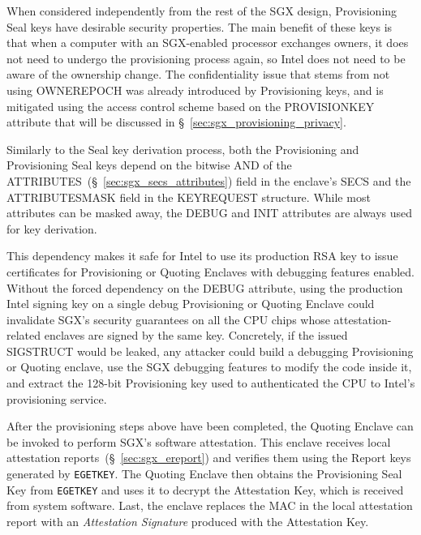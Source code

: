 When considered independently from the rest of the SGX design, Provisioning
Seal keys have desirable security properties. The main benefit of these keys is
that when a computer with an SGX-enabled processor exchanges owners, it does
not need to undergo the provisioning process again, so Intel does not need to
be aware of the ownership change. The confidentiality issue that stems from not
using OWNEREPOCH was already introduced by Provisioning keys, and is mitigated
using the access control scheme based on the PROVISIONKEY attribute that will
be discussed in \S~\ref{sec:sgx_provisioning_privacy}.

Similarly to the Seal key derivation process, both the Provisioning and
Provisioning Seal keys depend on the bitwise AND of the
ATTRIBUTES~(\S~\ref{sec:sgx_secs_attributes}) field in the enclave's SECS and
the ATTRIBUTESMASK field in the KEYREQUEST structure. While most attributes can
be masked away, the DEBUG and INIT attributes are always used for key
derivation.

This dependency makes it safe for Intel to use its production RSA key to issue
certificates for Provisioning or Quoting Enclaves with debugging features
enabled. Without the forced dependency on the DEBUG attribute, using the
production Intel signing key on a single debug Provisioning or Quoting Enclave
could invalidate SGX's security guarantees on all the CPU chips whose
attestation-related enclaves are signed by the same key.
Concretely, if the issued SIGSTRUCT would be leaked, any attacker could build a
debugging Provisioning or Quoting enclave, use the SGX debugging features to
modify the code inside it, and extract the 128-bit Provisioning key used to
authenticated the CPU to Intel's provisioning service.


After the provisioning steps above have been completed, the Quoting Enclave can
be invoked to perform SGX's software attestation. This enclave receives local
attestation reports~(\S~\ref{sec:sgx_ereport}) and verifies them using the
Report keys generated by \texttt{EGETKEY}. The Quoting Enclave then obtains the
Provisioning Seal Key from \texttt{EGETKEY} and uses it to decrypt the
Attestation Key, which is received from system software. Last, the enclave
replaces the MAC in the local attestation report with an \textit{Attestation
Signature} produced with the Attestation Key.


